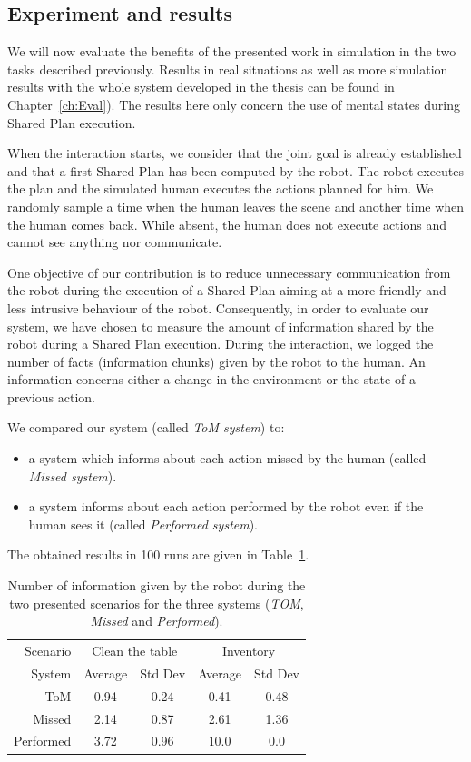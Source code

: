 \documentclass[english,a4paper,11pt,twoside]{StyleThese}
\begin{document}
\subsection{Experiment and results}

We will now evaluate the benefits of the presented work in simulation in the two tasks described previously. Results in real situations as well as more simulation results with the whole system developed in the thesis can be found in Chapter~\ref{ch:Eval}). The results here only concern the use of mental states during Shared Plan execution.

When the interaction starts, we consider that the joint goal is already established and that a first Shared Plan has been computed by the robot. The robot executes the plan and the simulated human executes the actions planned for him. We randomly sample a time when the human leaves the scene and another time when the human comes back. While absent, the human does not execute actions and cannot see anything nor communicate.

One objective of our contribution is to reduce unnecessary communication from the robot during the execution of a Shared Plan aiming at a more friendly and less intrusive behaviour of the robot. Consequently, in order to evaluate our system, we have chosen to measure the amount of information shared by the robot during a Shared Plan execution. During the interaction, we logged the number of facts (information chunks) given by the robot to the human. An information concerns either a change in the environment or the state of a previous action. 

We compared our system (called \textit{ToM system}) to:
\begin{itemize}
\item a system which informs about each action missed by the human (called \textit{Missed system}).
\item a system informs about each action performed by the robot even if the human sees it (called \textit{Performed system}).
\end{itemize}

The obtained results in 100 runs are given in Table~\ref{table:results}.

\begin{table}[ht]
\begin{center}
\begin{tabular}{|r||c|c||c|c|}
\hline
 Scenario & \multicolumn{2}{c||}{Clean the table} & \multicolumn{2}{c|}{Inventory}\\
\cline{2-5} 
System & Average & Std Dev & Average & Std Dev\\
\hline
\hline
ToM & 0.94 & 0.24 & 0.41 & 0.48\\
\hline
Missed & 2.14 & 0.87 & 2.61 & 1.36\\
\hline
Performed & 3.72 & 0.96 & 10.0 & 0.0\\
\hline
\end{tabular}
\end{center}
\caption{Number of information given by the robot during the two presented scenarios for the three systems (\textit{TOM}, \textit{Missed} and \textit{Performed}).}
\label{table:results}
\end{table}
\end{document}
